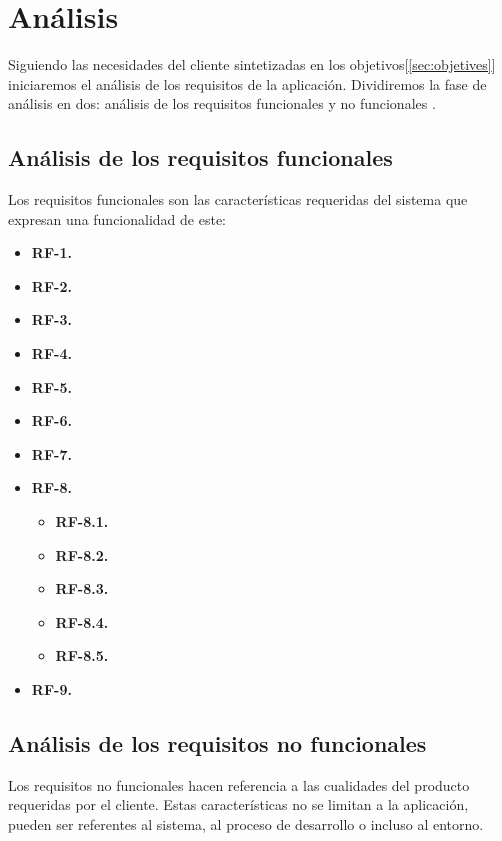 \chapter{Análisis}

Siguiendo las necesidades del cliente sintetizadas en los objetivos[\ref{sec:objetives}] iniciaremos el análisis de los requisitos de la aplicación. Dividiremos la fase de análisis en dos: análisis de los requisitos funcionales y no funcionales \cite{ing_software}.

\section{Análisis de los requisitos funcionales}

Los requisitos funcionales son las características requeridas del sistema que expresan una funcionalidad de este:


\begin{itemize}
	\item \textbf{RF-1.} 
	\item \textbf{RF-2.} 
	\item \textbf{RF-3.} 
	\item \textbf{RF-4.} 
	\item \textbf{RF-5.} 
	\item \textbf{RF-6.} 
	\item \textbf{RF-7.} 
	\item \textbf{RF-8.} 
		\begin{itemize}
			\item \textbf{RF-8.1.} 
			\item \textbf{RF-8.2.} 
			\item \textbf{RF-8.3.} 
			\item \textbf{RF-8.4.} 
			\item \textbf{RF-8.5.} 
		\end{itemize}
	\item \textbf{RF-9.} 
\end{itemize}


\section{Análisis de los requisitos no funcionales}

Los requisitos no funcionales hacen referencia a las cualidades del producto requeridas por el cliente. Estas características no se limitan a la aplicación, pueden ser referentes al sistema, al proceso de desarrollo o incluso al entorno.

